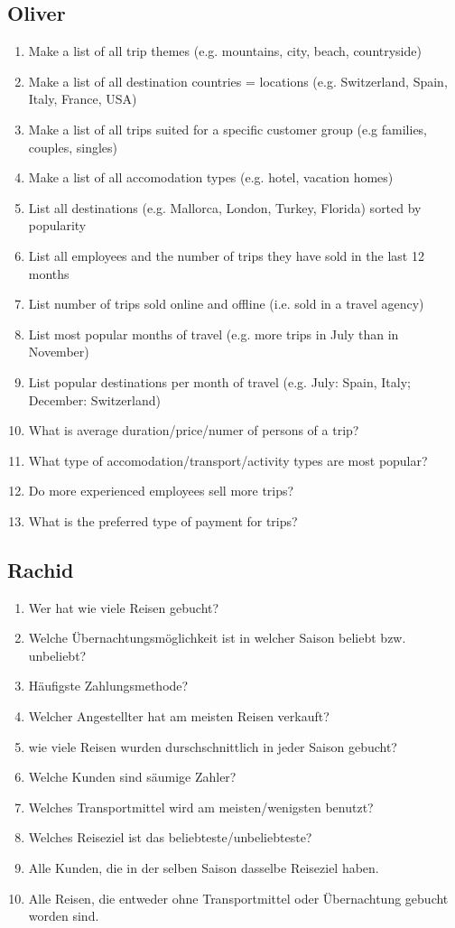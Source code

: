 \documentclass{article}
\begin{document}
	\subsection*{Oliver}
			\begin{enumerate}
				\item Make a list of all trip themes (e.g. mountains, city, beach, countryside)
				\item Make a list of all destination countries = locations (e.g. Switzerland, Spain, Italy, France, USA)
				\item Make a list of all trips suited for a specific customer group (e.g families, couples, singles)
				\item Make a list of all accomodation types (e.g. hotel, vacation homes)
				\item List all destinations (e.g. Mallorca, London, Turkey, Florida) sorted by popularity
				\item List all employees and the number of trips they have sold in the last 12 months
				\item List number of trips sold online and offline (i.e. sold in a travel agency)
				\item List most popular months of travel (e.g. more trips in July than in November)
				\item List popular destinations per month of travel (e.g. July: Spain, Italy; December: Switzerland)
				\item What is average duration/price/numer of persons of a trip?
				\item What type of accomodation/transport/activity types are most popular?
				\item Do more experienced employees sell more trips?
				\item What is the preferred type of payment for trips?
			\end{enumerate}
			
\subsection*{Rachid}
			\begin{enumerate}
					\item Wer hat wie viele Reisen gebucht?
					\item Welche Übernachtungsmöglichkeit ist in welcher Saison beliebt bzw. unbeliebt?
					\item Häufigste Zahlungsmethode?
					\item Welcher Angestellter hat am meisten Reisen verkauft?
					\item wie viele Reisen wurden durschschnittlich in jeder Saison gebucht?
					\item Welche Kunden sind säumige Zahler?
					\item Welches Transportmittel wird am meisten/wenigsten benutzt?
					\item Welches Reiseziel ist das beliebteste/unbeliebteste?
					\item Alle Kunden, die in der selben Saison dasselbe Reiseziel haben.
					\item Alle Reisen, die entweder ohne Transportmittel oder Übernachtung gebucht worden sind.
				\end{enumerate}	
				
\end{document}

